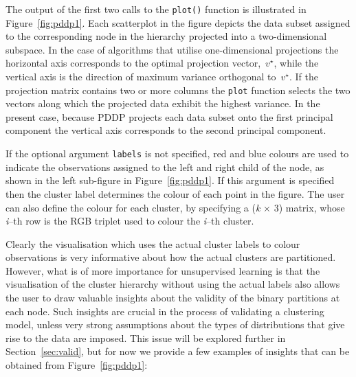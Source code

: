 \documentclass{book}
\begin{document}
\noindent
%
The output of the first two calls to the {\tt plot()} function is illustrated in
Figure~\ref{fig:pddp1}.
%
Each scatterplot in the figure depicts the data subset assigned to
the corresponding node in the hierarchy projected into a two-dimensional
subspace. In the case of algorithms that utilise one-dimensional projections
the horizontal axis corresponds to the optimal projection vector,~$v^\star$,
while the vertical axis is the direction of maximum variance orthogonal to~$v^\star$.
%
If the projection matrix contains two or more columns the {\tt plot} function
selects the two vectors along which the projected data exhibit the highest variance.
%
In the present case, because PDDP projects each data subset onto the first
principal component the vertical axis corresponds to the second principal component.

If the optional argument {\tt labels} is not specified, red and blue colours are used to
indicate the observations assigned to the left and right child of the node,
as shown in the left sub-figure in Figure~\ref{fig:pddp1}.
%
If this argument is specified then the cluster label determines
the colour of each point in the figure.
%
The user can also define the colour for each cluster, by specifying
a ({\it k} $\times$ 3) matrix, whose {\it i}--th row is the RGB triplet used to colour
the {\it i}--th cluster.



Clearly the visualisation which uses the actual cluster labels to colour
observations is very informative about how the actual clusters are partitioned.
%
However, what is of more importance for unsupervised learning is that the
visualisation of the cluster hierarchy without using the actual labels also
allows the user to draw valuable insights about the validity of the binary
partitions at each node. Such insights are crucial in the process of validating
a clustering model, unless very strong assumptions about the types of
distributions that give rise to the data are imposed. This issue will be
explored further in Section~\ref{sec:valid}, but for now we provide a few
examples of insights that can be obtained from Figure~\ref{fig:pddp1}: 
\end{document}
